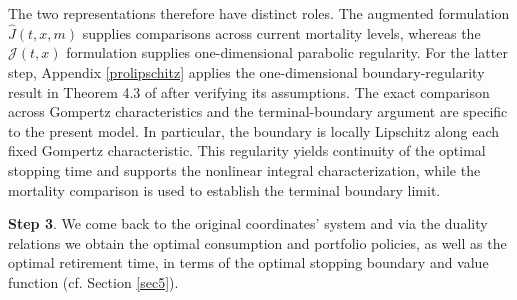 \documentclass[a4paper,11pt]{amsart}
\numberwithin{equation}{section}
\begin{document}
{The two representations therefore have distinct roles. The augmented formulation $\widehat J(t,x,m)$ supplies comparisons across current mortality levels, whereas the $\mathcal J(t,x)$ formulation supplies one-dimensional parabolic regularity. For the latter step, Appendix \ref{prolipschitz} applies the one-dimensional boundary-regularity result in Theorem 4.3 of \citet{de2019lipschitz} after verifying its assumptions. The exact comparison across Gompertz characteristics and the terminal-boundary argument are specific to the present model.} {In particular, the boundary is locally Lipschitz along each fixed Gompertz characteristic. This regularity yields continuity of the optimal stopping time and supports the nonlinear integral characterization, while the mortality comparison is used to establish the terminal boundary limit.}









\textbf{Step 3}. %
We come back to the original coordinates' system and via the duality relations we obtain the optimal consumption and portfolio policies, as well as the optimal retirement time, in terms of the optimal stopping boundary and value function (cf. Section \ref{sec5}).
\end{document}
